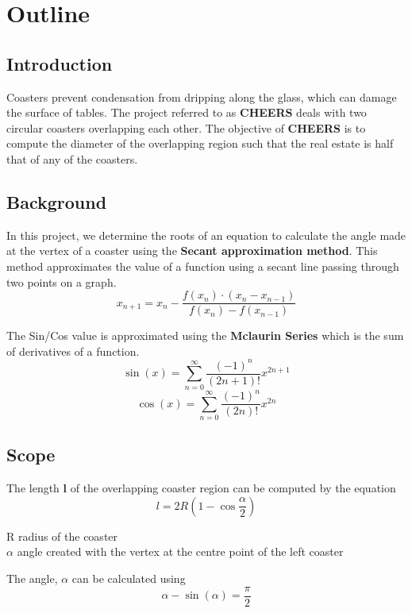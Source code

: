 \documentclass{report}
\begin{document}
\tableofcontents{}
\printindex{}

\chapter{Outline}
\section{Introduction}
  Coasters prevent condensation from dripping along the glass, which can damage the surface of tables. The project referred to as \textbf {CHEERS} deals with two circular coasters overlapping each other. The objective of \textbf {CHEERS} is to compute the diameter of the overlapping region such that 
  the real estate is half that of any of the coasters.

\section{Background}
  In this project, we determine the roots of an equation to calculate the angle made at the vertex of a coaster using the \textbf{Secant approximation method}. This method approximates the value of a function using a secant line passing through two points on a graph.
  $$ x_{n+1} = x_n - \frac{f(x_n) \cdot (x_n - x_{n-1})}{f(x_n) - f(x_{n-1})} $$

  \vspace*{20pt}
  \noindent The Sin/Cos value is approximated using the \textbf{Mclaurin Series} which is the sum of derivatives of a function.
  $$\sin(x) = \sum_{n=0}^{\infty} \frac{(-1)^n}{(2n+1)!}x^{2n+1}$$
  $$\cos(x) = \sum_{n=0}^{\infty} \frac{(-1)^n}{(2n)!}x^{2n}$$ 

\section{Scope}
  The length \textbf{l} of the overlapping coaster region can be computed by the equation
  $$l = 2R\left(1 - \cos\frac{\alpha}{2}\right)$$

  \indent R \textrightarrow \;radius of the coaster \\
  \indent $\alpha$ \textrightarrow \;angle created with the vertex at the centre point of the left coaster

  \vspace{20pt}
  The angle, $\alpha$ can be calculated using
  $$\alpha - \sin(\alpha) = \frac{\pi}{2}$$
  
  \vspace*{20pt}
  
\end{document}
